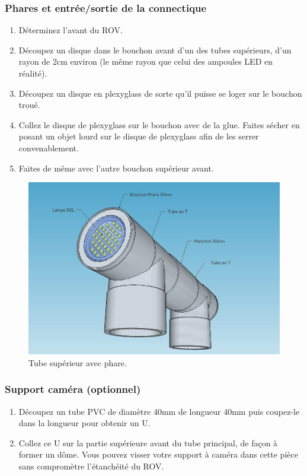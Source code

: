 \documentclass[11pt,a4paper]{article}
\begin{document}
        \subsubsection{Phares et entrée/sortie de la connectique}
          \begin{enumerate}
            \item Déterminez l'avant du ROV.
            \item Découpez un disque dans le bouchon avant d'un des tubes supérieurs, d'un rayon de 2cm environ (le même rayon que celui des ampoules LED en réalité).
            \item Découpez un disque en plexyglass de sorte qu'il puisse se loger sur le bouchon troué.
            \item Collez le disque de plexyglass sur le bouchon avec de la glue. Faites sécher en posant un objet lourd sur le disque de plexyglass afin de les serrer convenablement.
            \item Faites de même avec l'autre bouchon supérieur avant.
          \end{enumerate}
          
          \begin{figure}[H]
            \centering
            \includegraphics[scale=0.4]{ROVTubeSuperieurFace.jpg}
            \caption{Tube supérieur avec phare.}
          \end{figure}
          
          
        \subsubsection{Support caméra (optionnel)}
          \begin{enumerate}
            \item Découpez un tube PVC de diamètre 40mm de longueur 40mm puis coupez-le dans la longueur pour obtenir un U.
            
            \item Collez ce U sur la partie supérieure avant du tube principal, de façon à former un dôme. Vous pouvez visser votre support à caméra dans cette pièce sans compromètre l'étanchéité du ROV.
          \end{enumerate}
          
\end{document}
